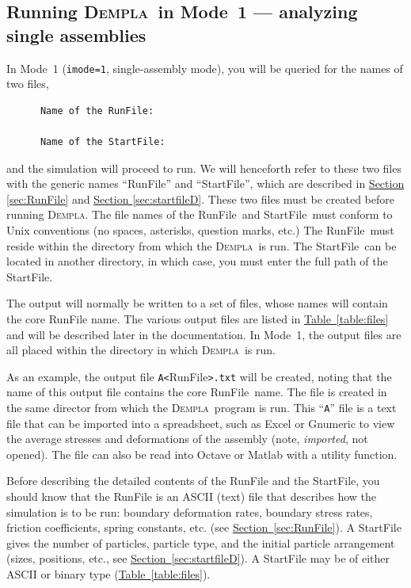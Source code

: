 \documentclass[letterpaper,11pt]{article}
\newcommand{\Dempla}{\textsc{Dempla}}
\newcommand{\RunFile}{\textsf{RunFile}}
\newcommand{\StartFile}{\textsf{StartFile}}
\begin{document}
\subsection{Running \Dempla\ in Mode~1 --- analyzing single assemblies}
	In Mode~1 (\texttt{imode=1}, single-assembly mode),
    you will be queried for the names of two
    files,
    \begin{verbatim}
      Name of the RunFile:
      
      Name of the StartFile:
    \end{verbatim}
    and the simulation will proceed to run.
    We will henceforth refer to these two files 
    with the generic names ``\textsf{RunFile}'' and
    ``\textsf{StartFile}'', which are described in
    \hyperref[sec:RunFile]{Section \ref*{sec:RunFile}}
    and
    \hyperref[sec:startfileD]{Section \ref*{sec:startfileD}}.
    These two files must be created before running
    \Dempla.
    The file names of the \RunFile\ and \StartFile\ must
    conform to Unix conventions
    (no spaces, asterisks, question marks, etc.)
    The \RunFile\ must reside within the directory from
    which the \Dempla\ is run.
    The \StartFile\ can be located in another directory,
    in which case, you must enter the full path of the
    \StartFile.
    \par
    The output will normally be written to a set of files,
    whose names will
    contain the core \textsf{RunFile} name.
    The various output files are listed in
    \hyperref[table:files]{Table~\ref*{table:files}}
    and 
    will be described later in the documentation.
    In Mode~1, the output files are all placed within
    the directory in which \Dempla\ is run.
    \par
    As an example,
    the output file \mbox{\texttt{A<}\textsf{RunFile}\texttt{>.txt}}
    will be created, noting that
    the name of this output file contains
    the core \RunFile\ name.
    The file is created in the same director from which the
    \Dempla\ program is run.
    This ``\texttt{A}'' file
    is a text file that can be imported into a spreadsheet, such as
    Excel or Gnumeric to view the average stresses and deformations
    of the assembly (note, \emph{imported}, not opened).
    The file can also be read into Octave or Matlab with a utility function.
    \par
    Before describing the detailed contents of the \textsf{RunFile}
    and the \textsf{StartFile}, you should know
    that the \textsf{RunFile}
    is an ASCII (text) file that describes
    how the simulation is to be run:
    boundary deformation rates, boundary stress rates,
    friction coefficients, spring constants, etc.
    (see \hyperref[sec:RunFile]{Section~\ref*{sec:RunFile}}).
    A \textsf{StartFile} gives the number of particles, particle type,
    and the initial particle arrangement (sizes, positions, etc.,
    see \hyperref[sec:startfileD]{Section~\ref*{sec:startfileD}}).
    A \textsf{StartFile} may be of either ASCII or binary type
    (\hyperref[table:files]{Table~\ref*{table:files}}).
\end{document}
